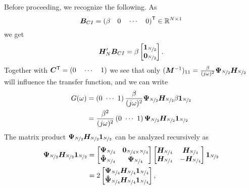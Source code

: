 Before proceeding, we recognize the following. As
\begin{equation}
    \bm{B}_{CI} = \left( \beta \quad 0 \quad \cdots \quad 0 \right)^\mathsf{T} \in \mathbb{R}^{N \times 1}
\end{equation}
we get
\begin{equation}
    \bm{H_}{N}' \bm{B}_{CI} = \beta
    \begin{bmatrix}
        \bm{1}_{\nicefrac{N}{2}} \\
        \bm{0}_{\nicefrac{N}{2}}
    \end{bmatrix}.
\end{equation}
Together with $\bm{C}^\mathsf{T} = \left(0 \quad \cdots \quad 1 \right)$ we see that only $(\bm{M}^{-1})_{11} = \frac{\beta}{(j\omega)^2}\bm{\Psi}_{\nicefrac{N}{2}}\bm{H_}{\nicefrac{N}{2}}$ will influence the transfer function, and we can write
\begin{align}
    G(\omega) & = \left( 0 \ \cdots \ 1 \right) \frac{\beta}{(j\omega)^2}\bm{\Psi}_{\nicefrac{N}{2}}\bm{H_}{\nicefrac{N}{2}} \beta \bm{1}_{\nicefrac{N}{2}} \\
              & = \frac{\beta^2}{(j\omega)^2} \left( 0 \ \cdots \ 1 \right) \bm{\Psi}_{\nicefrac{N}{2}}\bm{H_}{\nicefrac{N}{2}} \bm{1}_{\nicefrac{N}{2}}
\end{align}
The matrix product $\bm{\Psi}_{\nicefrac{N}{2}}\bm{H_}{\nicefrac{N}{2}} \bm{1}_{\nicefrac{N}{2}}$ can be analyzed recursively as
\begin{align}
    \bm{\Psi}_{\nicefrac{N}{2}}\bm{H_}{\nicefrac{N}{2}} \bm{1}_{\nicefrac{N}{2}} & =
    \begin{bmatrix}
        \bm{\Psi}_{\nicefrac{N}{4}} & \bm{0}_{\nicefrac{N}{4} \times \nicefrac{N}{4}} \\
        \bm{\hat{\Psi}}_{\nicefrac{N}{4}} & \bm{\Psi}_{\nicefrac{N}{4}}
    \end{bmatrix}
    \begin{bmatrix}
        \bm{H_}{\nicefrac{N}{4}} & \bm{H_}{\nicefrac{N}{4}} \\
        \bm{H_}{\nicefrac{N}{4}} & -\bm{H_}{\nicefrac{N}{4}}
    \end{bmatrix}
    \bm{1}_{\nicefrac{N}{2}} \\
    & = 2
    \begin{bmatrix}
        \bm{\Psi}_{\nicefrac{N}{4}}\bm{H_}{\nicefrac{N}{4}} \bm{1}_{\nicefrac{N}{4}} \\
        \bm{\hat{\Psi}}_{\nicefrac{N}{4}}\bm{H_}{\nicefrac{N}{4}} \bm{1}_{\nicefrac{N}{4}}
    \end{bmatrix},
\end{align}
